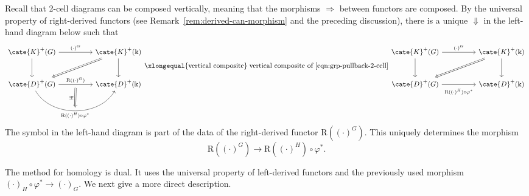 Recall that 2-cell diagrams can be composed vertically, meaning that the
morphisms $\Rightarrow$ between functors are composed. By the universal
property of right-derived functors (see
Remark~\ref{rem:derived-can-morphism} and the preceding discussion), there is
a unique $\Downarrow$ in the left-hand diagram below such that
	{\scriptsize
	\begin{equation}\label{eqn:change-of-groups-univ}
	\begin{tikzcd}[column sep=huge, row sep=large]
		\cate{K}^+(G) \arrow[r, "{(\cdot)^G}"] \arrow[d] & \cate{K}^+(\Bbbk) \arrow[d] \arrow[Rightarrow, ld] \\
		\cate{D}^+(G) \arrow[r, "{\mathrm{R}((\cdot)^G)}", ""' {name=D}] \arrow[r, bend right=60, "" {name=U}, "{\mathrm{R}((\cdot)^H) \circ \varphi^*}"'] & \cate{D}^+(\Bbbk) \arrow[Rightarrow, from=D, to=U, "{\exists!}"']
	\end{tikzcd} \xlongequal{\text{vertical composite}} \;\text{vertical composite of \eqref{eqn:grp-pullback-2-cell}}
	\begin{tikzcd}[column sep=huge, row sep=large]
		\cate{K}^+(G) \arrow[r, "{(\cdot)^G}"] \arrow[d] & \cate{K}^+(\Bbbk) \arrow[d] \arrow[Rightarrow, ld] \\
		\cate{D}^+(G) \arrow[r, "{\mathrm{R}((\cdot)^H) \circ \varphi^*}"' inner sep=0.6em] & \cate{D}^+(\Bbbk)
	\end{tikzcd}
	\end{equation}
	}
The symbol  in the left-hand diagram is
part of the data of the right-derived functor
$\mathrm{R}\left((\cdot)^G\right)$. This uniquely determines the morphism
\[ \mathrm{R}\left( (\cdot)^G \right) \to \mathrm{R}\left((\cdot)^H \right) \circ \varphi^* . \]

The method for homology is dual. It uses the universal property of
left-derived functors and the previously used morphism
$(\cdot)_H\circ\varphi^*\to(\cdot)_G$. We next give a more direct
description.

